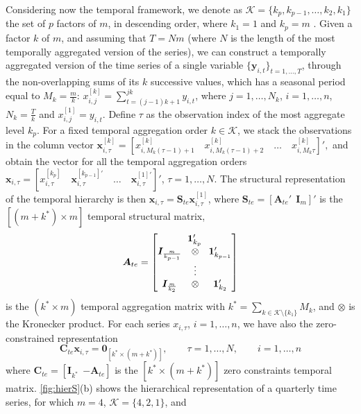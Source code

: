 \documentclass[12pt]{article}
\newcommand{\Unovet}{\bm{1}}
\newcommand{\xvet}{\bm{x}}
\newcommand{\yvet}{\bm{y}}
\newcommand{\Avet}{\bm{A}}
\newcommand{\Cvet}{\bm{C}}
\newcommand{\Ivet}{\bm{I}}
\newcommand{\Svet}{\bm{S}}
\newcommand{\Zerovet}{\bm{0}}
\theoremstyle{definition}
\begin{document}
Considering now the temporal framework, we denote as $\mathcal{K} = \{ k_p , k_{p-1}, \dots, k_2, k_1 \}$ the set of $p$ factors of $m$, in descending order, where $k_1= 1$ and $k_p= m$ \citep{athanasopoulos2017}. Given a factor $k$ of $m$, and assuming that $T = N m$ (where $N$ is the length of the most temporally aggregated version of the series), we can construct a temporally aggregated version of the time series of a single variable $\{\yvet_{i,t}\}_{t = 1, \dots, T}$, through the non-overlapping sums of its $k$ successive values, which has a seasonal period equal to $M_k= \displaystyle\frac{m}{k}$: $x_{i,j}^{[k]} = \displaystyle\sum_{t=(j-1)k+1}^{jk} y_{i,t}$, where $j = 1,\dots, N_k$, $i = 1,\dots,n$, $N_k = \displaystyle\frac{T}{k}$ and $x_{i,j}^{[1]}=y_{i,t}$. Define $\tau$ as the observation index of the most aggregate level $k_p$. For a fixed temporal aggregation order $k \in \mathcal{K}$, we stack the observations in the column vector $\xvet_{i,\tau}^{[k]} = \left[x_{i,M_k(\tau-1)+1}^{[k]} \quad x_{i,M_k(\tau-1)+2}^{[k]} \quad \dots \quad x_{i,M_k\tau}^{[k]}\right]',$ and obtain the vector for all the temporal aggregation orders $\xvet_{i,\tau} = \left[x_{i,\tau}^{[k_p]} \quad \xvet_{i,\tau}^{[k_{p-1}]\prime} \quad \dots \quad \xvet_{i,\tau}^{[1]\prime} \right]'$, $\tau = 1,\dots,N$. The structural representation of the temporal hierarchy \citep{athanasopoulos2017} is then $\xvet_{i,\tau} = \Svet_{te}\xvet_{i,\tau}^{[1]}$, where $\Svet_{te} = [\Avet_{te}' ~~ \Ivet_{m}]'$ is the $[(m+k^\ast) \times m]$ temporal structural matrix,
$$
	\Avet_{te} = \begin{bmatrix}
		\multicolumn{3}{c}{\Unovet_{k_p}'}                       \\
		\Ivet_{\frac{m}{k_{p-1}}} & \otimes & \Unovet_{k_{p-1}}' \\
		                          & \vdots  &                    \\
		\Ivet_{\frac{m}{k_{2}}}   & \otimes & \Unovet_{k_2}'
	\end{bmatrix}
$$
is the $(k^\ast \times m)$ temporal aggregation matrix with $k^\ast = \displaystyle\sum_{k \in \mathcal{K}\setminus\{k_1\}} M_k$, and $\otimes$ is the Kronecker product. For each series $x_{i,\tau}$, $i = 1,\dots,n$, we have also the zero-constrained representation
\begin{equation}
	\label{eq:te_con}
	\Cvet_{te}\xvet_{i,\tau} = \Zerovet_{[k^\ast \times (m+k^\ast)]}, \qquad \tau = 1,\dots,N, \qquad i = 1,\dots, n
\end{equation}
where $\Cvet_{te} = [\Ivet_{k^\ast} ~~ {-\Avet_{te}}]$ is the $[k^\ast \times (m+k^\ast)]$ zero constraints temporal matrix. \autoref{fig:hierS}(b) shows the hierarchical representation of a quarterly time series, for which $m = 4$, $\mathcal{K} = \{4,2,1\}$, and
\end{document}
